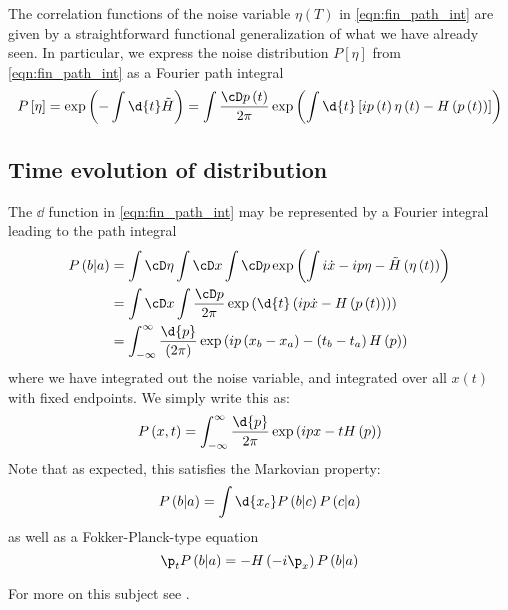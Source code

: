 \documentclass{booc}
\begin{document}
The correlation functions of the noise variable $\eta\left( T \right)$ in
\cref{eqn:fin_path_int} are given by a straightforward functional generalization of what we
have already seen.
In particular, we express the noise distribution $P\left[ \eta \right]$ from \cref{eqn:fin_path_int}
as a Fourier path integral
\begin{align}
P\left[ \eta \right] = 
\exp\left( -\int \d{t} \tilde H \right) =
\int \frac{\cD p\left( t \right)}{2\pi}
\exp\left( \int \d{t} \left[ ip\left( t \right) \eta\left( t \right)
- H\left( p\left( t \right) \right)\right] \right)
\end{align}

\subsection{Time evolution of distribution}

The $\dd$ function in \cref{eqn:fin_path_int} may be represented by a Fourier integral leading to the
path integral
\begin{align}
P\left( b\vert a \right) &=
\int \cD \eta \int \cD x \int \cD p
\exp\left( \int i\dot x - i p\eta - \tilde H\left( \eta\left( t \right) \right) \right) \\
&= \int \cD x \int \frac{\cD p}{2\pi}
\exp\left( \d{t} \left( ip\dot x - H\left( p\left( t \right) \right) \right) \right) \\
&= \int_{-\infty}^\infty \frac{\d{p}}{\left( 2\pi \right)}
\exp\left( ip\left( x_b - x_a \right) - 
\left( t_b - t_a \right)H\left( p \right)\right)
\end{align}
where we have integrated out the noise variable, and integrated over all $x\left( t \right)$
with fixed endpoints. We simply write this as:
\begin{equation}
P\left( x,t \right) = \int_{-\infty}^\infty \frac{\d{p}}{2\pi}
\exp\left( ipx - t H\left( p \right) \right)
\end{equation}
Note that as expected, this satisfies the Markovian property:
\begin{equation}
P\left( b\vert a \right) = \int \d{x_c} P\left( b\vert c \right)P\left( c\vert a \right)
\end{equation}
as well as a
Fokker-Planck-type equation
\begin{equation}
\p_t P\left( b\vert a \right) = 
-H\left( -i\p_x \right) P\left( b\vert a \right)
\end{equation}

For more on this subject see \cites{kleinert_finance,wise_finance}.


\end{document}
